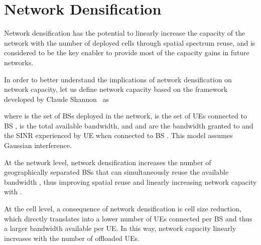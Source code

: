 \documentclass{IEEEtran}
\begin{document}
\begin{figure*}[t!]
  \centering
  \caption{Average number of active \acp{BS} in the network per square km and average number of active \acp{UE} per active \ac{BS}.
  The \ac{UE} densities are 600, 300 and 100 active \acp{UE} per km.
  The UE distributions are uniform and non-uniform within the scenario.
  The rest of the parameters are , \,GHz,  and 12\,dB.}
\label{fig:activeCellsAndUes}
\end{figure*}











\section{Network Densification}
\label{sec:densification}

Network densification has the potential to linearly increase the capacity of the network with the number of deployed cells
through spatial spectrum reuse,
and is considered to be the key enabler to provide most of the capacity gains in future networks.

In order to better understand the implications of network densification on network capacity,
let us define network capacity based on the framework developed by Claude Shannon~\cite{Shanon1948} as

where  is the set of \acp{BS} deployed in the network,
 is the set of \acp{UE} connected to \ac{BS} ,
 is the total available bandwidth,
and  and  are the bandwidth granted to and the \ac{SINR} experienced by
\ac{UE}  when connected to \ac{BS} .
This model assumes Gaussian interference.


At the network level,
network densification increases the number of geographically separated \acp{BS} 
that can simultaneously reuse the available bandwidth ,
thus improving spatial reuse and linearly increasing network capacity with .

At the cell level,
a consequence of network densification is cell size reduction,
which directly translates into a lower number of \acp{UE}  connected per \ac{BS}  and thus a larger bandwidth  available per \ac{UE}.
In this way, network capacity linearly increases with the number of offloaded \acp{UE}.
\end{document}
